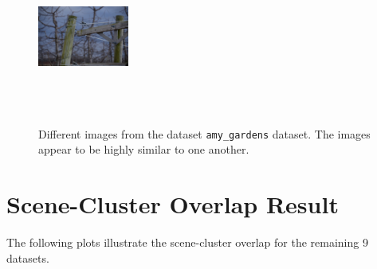\documentclass[report.tex]{subfiles}
\begin{document}
\begin{figure}[htbp]
\begin{minipage}[t]{0.32\textwidth}
        \end{minipage}
        \hfill
        \begin{minipage}[t]{0.32\textwidth}
            \centering
            \includegraphics[width=3cm, height=5cm]{images/amy_gardens_dataset/peach_0058.png}
            \label{fig:amygardens6}
        \end{minipage}

        \caption{Different images from the dataset \texttt{amy\_gardens} dataset. The images appear to be highly similar to one another.}
        \label{fig:amygardens_dataset}
    \end{figure}

    \section{Scene-Cluster Overlap Result} \label{appendix:A2}
    The following plots illustrate the scene-cluster overlap for the remaining 9 datasets.
\end{document}
